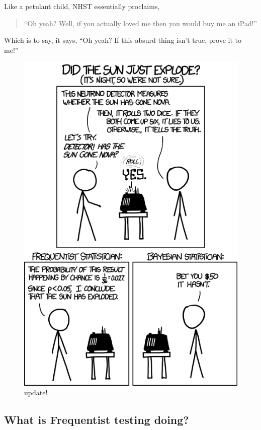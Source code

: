 \documentclass[
]{book}
\theoremstyle{definition}
\theoremstyle{definition}
\theoremstyle{definition}
\theoremstyle{definition}
\theoremstyle{remark}
\begin{document}
Like a petulant child, NHST essentially proclaims,

\begin{quote}
``Oh yeah? Well, if you actually loved me then you would buy me an iPad!''
\end{quote}

Which is to say, it says, ``Oh yeah? If this absurd thing isn't true, prove it to me!''

\begin{figure}
\centering
\includegraphics{./images/frequentists_vs_bayesians.png}
\caption{update!}
\end{figure}

\hypertarget{what-is-frequentist-testing-doing}{%
\subsection*{What is Frequentist testing doing?}\label{what-is-frequentist-testing-doing}}
\end{document}
